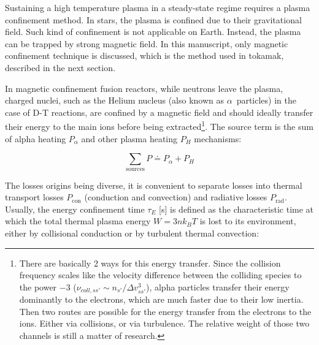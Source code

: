 Sustaining a high temperature plasma in a steady-state regime requires a plasma confinement method. In stars, the plasma is confined due to their gravitational field. Such kind of confinement is not applicable on Earth. Instead, the plasma can be trapped by strong magnetic field. In this manuscript, only magnetic confinement technique is discussed, which is the method used in tokamak, described in the next section. 

In magnetic confinement fusion reactors, while neutrons leave the plasma, charged nuclei, such as the Helium nucleus (also known as $\alpha$~particles) in the case of D-T reactions, are confined by a magnetic field and should ideally transfer their energy to the main ions before being extracted\footnote{There are basically 2 ways for this energy transfer. Since the collision frequency scales like the velocity difference between the colliding species to the power $-3$ ($\nu_{coll,ss'}\sim n_{s'}/\Delta v_{ss'}^3$), alpha particles transfer their energy dominantly to the electrons, which are much faster due to their low inertia. Then two routes are possible for the energy transfer from the electrons to the ions. Either via collisions, or via turbulence. The relative weight of those two channels is still a matter of research.}. The source term is the sum of alpha heating $P_\alpha$ and other plasma heating $P_{H}$ mechanisms:

\begin{equation}
\sum_{\mathrm{sources}} P
	\doteq 
	P_\alpha + P_{H} 
	\label{eq:sources}
\end{equation}

The losses origins being diverse, it is convenient to separate losses into thermal transport losses $P_{\mathrm{con}}$ (conduction and convection) and radiative losses $P_{\mathrm{rad}}$. Usually, the energy confinement time $\tau_E$ [\si{s}] is defined as the characteristic time at which the total thermal plasma energy $W=3 n k_B T$ is lost to its environment, either by collisional conduction or by turbulent thermal convection:

